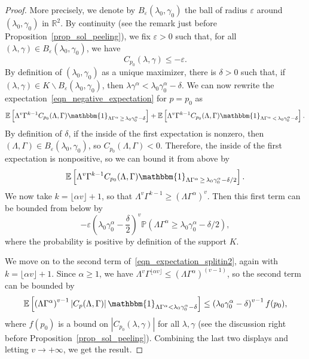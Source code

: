 \documentclass[AHL,Unicode,longabstracts,published]{cedram}
\newcommand{\eps}{\varepsilon}
\newcommand{\R}{\mathbb{R}}
\newcommand{\E}{\mathbb{E}}
\renewcommand{\P}{\mathbb{P}}
\newcommand{\bbmun}{\mathbbm{1}}
\begin{document}
\begin{proof}
More precisely, we denote by $B_{\eps}(\lambda_0, \gamma_0)$ the ball of radius $\eps$ around $(\lambda_0,\gamma_0)$ in $\R^2$. By continuity (see the remark just before Proposition~\ref{prop_sol_peeling}), we fix $\eps>0$ such that, for all $(\lambda, \gamma) \in B_{\eps}(\lambda_0,\gamma_0)$, we have
\[
C_{p_0}(\lambda, \gamma) \leq -\eps.
\]
By definition of $(\lambda_0, \gamma_0)$ as a unique maximizer, there is $\delta>0$ such that, if $(\lambda, \gamma) \in K \backslash B_{\eps}(\lambda_0, \gamma_0)$, then $\lambda \gamma^{\alpha} < \lambda_0 \gamma_0^{\alpha}-\delta$. We can now rewrite the expectation~\eqref{eqn_negative_expectation} for $p=p_0$ as
\begin{equation}\label{eqn_expectation_splitin2}
\E \left[\Lambda^v \Gamma^{k-1} C_{p_0}(\Lambda, \Gamma) \bbmun_{\Lambda \Gamma^{\alpha}\,\geq \,\lambda_0 \gamma_0^{\alpha}-\delta} \right] + \E \left[\Lambda^v \Gamma^{k-1} C_{p_0}(\Lambda, \Gamma) \bbmun_{\Lambda \Gamma^{\alpha}\,<\,\lambda_0 \gamma_0^{\alpha}-\delta} \right].
\end{equation}
By definition of $\delta$, if the inside of the first expectation is nonzero, then $(\Lambda, \Gamma) \in B_{\eps}(\lambda_0,\gamma_0)$, so $C_{p_0}(\Lambda, \Gamma)<0$. Therefore, the inside of the first expectation is nonpositive, so we can bound it from above by
\[
\E \left[\Lambda^v \Gamma^{k-1} C_{p_0}(\Lambda, \Gamma) \bbmun_{\Lambda \Gamma^{\alpha}\,\geq\,\lambda_0 \gamma_0^{\alpha}-\delta/2} \right].
\]
We now take $k = \lfloor \alpha v \rfloor+1$, so that $\Lambda^v \Gamma^{k-1} \geq (\Lambda \Gamma^{\alpha})^v$. Then this first term can be bounded from below by
\[
-\eps \left(\lambda_0 \gamma_0^{\alpha}-\frac{\delta}{2} \right)^v \P \left(\Lambda \Gamma^{\alpha} \geq \lambda_0 \gamma_0^{\alpha}-\delta/2 \right),
\]
where the probability is positive by definition of the support $K$.

We move on to the second term of~\eqref{eqn_expectation_splitin2}, again with $k = \lfloor \alpha v \rfloor+1$. Since $\alpha \geq 1$, we have $\Lambda^v \Gamma^{\lfloor \alpha v \rfloor} \leq (\Lambda \Gamma^{\alpha})^{(v-1)}$, so the second term can be bounded by
\[
\E \left[\left(\Lambda \Gamma^{\alpha} \right)^{v-1} \left| C_p(\Lambda, \Gamma) \right| \bbmun_{\Lambda \Gamma^{\alpha} < \lambda_0 \gamma_0^{\alpha}-\delta} \right] \leq \left(\lambda_0 \gamma_0^{\alpha} -\delta \right)^{v-1} f(p_0),
\]
where $f(p_0)$ is a bound on $|C_{p_0}(\lambda, \gamma)|$ for all $\lambda, \gamma$ (see the discussion right before Proposition~\ref{prop_sol_peeling}). Combining the last two displays and letting $v \to +\infty$, we get the result.
\end{proof}
\end{document}
